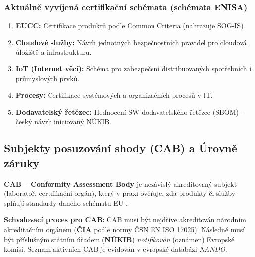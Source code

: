 \documentclass[10pt,a4paper]{article}
\begin{document}
	\subsubsection*{Aktuálně vyvíjená certifikační schémata (schémata ENISA)}
	\begin{enumerate}
		\item \textbf{EUCC:} Certifikace produktů podle Common Criteria (nahrazuje SOG-IS)
		
		\item \textbf{Cloudové služby:} Návrh jednotných bezpečnostních pravidel pro cloudová úložiště a infrastrukturu.
		
		\item \textbf{IoT (Internet věcí):} Schéma pro zabezpečení distribuovaných spotřebních i průmyslových prvků.
		
		\item \textbf{Procesy:} Certifikace systémových a organizačních procesů v IT.
		
		\item \textbf{Dodavatelský řetězec:} Hodnocení SW dodavatelského řetězce (SBOM) – český návrh iniciovaný NÚKIB.
	\end{enumerate}
					
	\subsection{Subjekty posuzování shody (CAB) a Úrovně záruky}
	\textbf{CAB -- Conformity Assessment Body} je nezávislý akreditovaný subjekt (laboratoř, certifikační orgán), který v praxi ověřuje, zda produkty či služby splňují standardy daného schématu EU .
	
	\textbf{Schvalovací proces pro CAB:} CAB musí být nejdříve akreditován národním akreditačním orgánem (\textbf{ČIA} podle normy ČSN EN ISO 17025). Následně musí být příslušným státním úřadem (\textbf{NÚKIB}) \textit{notifikován} (oznámen) Evropské komisi. Seznam aktivních CAB je evidován v evropské databázi \textit{NANDO}.
	
\end{document}
